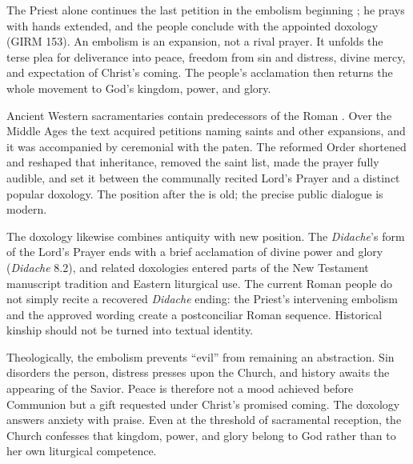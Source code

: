 
The Priest alone continues the last petition in the embolism beginning ; he prays with hands extended, and the people conclude with the appointed doxology (GIRM 153). An embolism is an expansion, not a rival prayer. It unfolds the terse plea for deliverance into peace, freedom from sin and distress, divine mercy, and expectation of Christ's coming. The people's acclamation then returns the whole movement to God's kingdom, power, and glory.

Ancient Western sacramentaries contain predecessors of the Roman . Over the Middle Ages the text acquired petitions naming saints and other expansions, and it was accompanied by ceremonial with the paten. The reformed Order shortened and reshaped that inheritance, removed the saint list, made the prayer fully audible, and set it between the communally recited Lord's Prayer and a distinct popular doxology. The position after the  is old; the precise public dialogue is modern.

The doxology likewise combines antiquity with new position. The \emph{Didache}'s form of the Lord's Prayer ends with a brief acclamation of divine power and glory (\emph{Didache} 8.2), and related doxologies entered parts of the New Testament manuscript tradition and Eastern liturgical use. The current Roman people do not simply recite a recovered \emph{Didache} ending: the Priest's intervening embolism and the approved wording create a postconciliar Roman sequence. Historical kinship should not be turned into textual identity.

Theologically, the embolism prevents ``evil'' from remaining an abstraction. Sin disorders the person, distress presses upon the Church, and history awaits the appearing of the Savior. Peace is therefore not a mood achieved before Communion but a gift requested under Christ's promised coming. The doxology answers anxiety with praise. Even at the threshold of sacramental reception, the Church confesses that kingdom, power, and glory belong to God rather than to her own liturgical competence.


